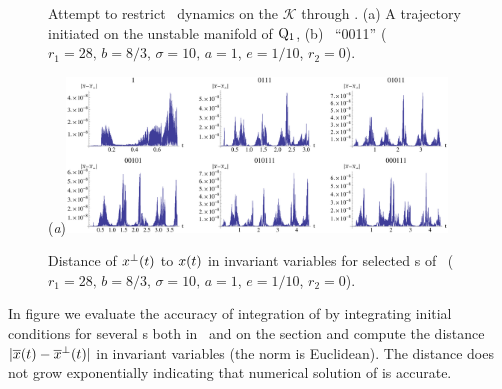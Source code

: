 {\begin{figure}[ht]
\begin{center}
\end{center}
\caption[\CLe\ desymmetrization with transverse integration]{
Attempt to restrict \CLe\ dynamics on the {\slice} $\mathcal{K}$ through
. (a) A trajectory initiated on the unstable
manifold of $\mathrm{Q}_{1}$, (b) \rpo\ ``0011''
($r_1=28,\, b=8/3,\, \sigma=10,\, a=1$, $e=1/10$, $r_2=0$).
    }
\label{fig:CLEtransv}
\end{figure}

\begin{figure}[ht]
\begin{center}
  (\textit{a})\includegraphics[width=0.9\textwidth, clip=true]{../figs/CLEerrTransv}
\end{center}
\caption[Numerical error in \CLe\ desymmetrization with transverse integration]{
Distance of $x^\perp(t)$ to $x(t)$ in invariant variables
for selected \rpo s of \CLe\,
($r_1=28,\, b=8/3,\, \sigma=10,\, a=1$, $e=1/10$, $r_2=0$).
    }
\label{fig:CLEerrTransv}
\end{figure}

In figure  we evaluate the accuracy
of integration of  by integrating
initial conditions for several \rpo s both in \statesp\ and
on the section and compute the distance
$|\overline{x}(t)-\overline{x}^\perp(t)|$ in invariant
variables  (the norm is Euclidean). The
distance does not grow exponentially indicating that
numerical solution of  is accurate.

}
